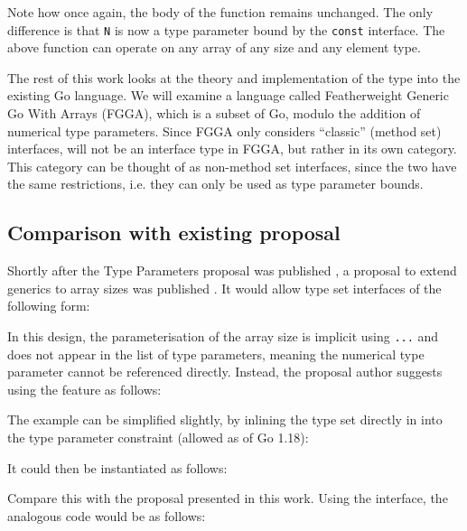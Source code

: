 
Note how once again, the body of the function remains unchanged. The only
difference is that \texttt{N} is now a type parameter bound by the
\texttt{const} interface. The above function can operate on any array of any
size and any element type.

The rest of this work looks at the theory and implementation of the 
type into the existing Go language. We will examine a language called
Featherweight Generic Go With Arrays (FGGA), which is a subset of Go, modulo the
addition of numerical type parameters. Since FGGA only considers ``classic''
(method set) interfaces,  will not be an interface type in FGGA, but
rather in its own category. This category can be thought of as non-method set
interfaces, since the two have the same restrictions, i.e. they can only be used
as type parameter bounds.

\subsection{Comparison with existing proposal}

Shortly after the Type Parameters proposal was published
\autocite{genericsProposal}, a proposal to extend generics to array sizes was
published \autocite{goArrayProposal}. It would allow type set interfaces of the
following form:


In this design, the parameterisation of the array size is implicit using
\texttt{...} and does not appear in the list of type parameters, meaning the
numerical type parameter cannot be referenced directly. Instead, the proposal
author suggests using the feature as follows:


The example can be simplified slightly, by inlining the type set
directly in into the type parameter constraint (allowed as of Go 1.18):


It could then be instantiated as follows:


Compare this with the proposal presented in this work. Using the 
interface, the analogous code would be as follows:

